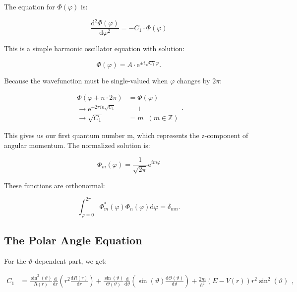 \documentclass[
  a4paper,
]{book}
\begin{document}
The equation for \(\Phi(\varphi)\) is:

\[
\frac{\mathrm{d}^2 \Phi \left(\varphi \right)}{\mathrm{d} \varphi^2} = - C_1 \cdot \Phi \left(\varphi \right)
\]

This is a simple harmonic oscillator equation with solution:

\[
\Phi \left(\varphi \right) = A \cdot \mathrm{e}^{\pm i \sqrt{C_1}\varphi} \mathrm{.}
\]

Because the wavefunction must be single-valued when \(\varphi\) changes
by \(2\pi\):

\[
\begin{aligned}
\Phi \left(\varphi + n \cdot 2 \pi \right) & =  \Phi \left(\varphi \right)\\
\longrightarrow \mathrm{e}^{\pm 2 \pi i n \sqrt{C_1}} & =  1\\
\longrightarrow \sqrt{C_1} & =  m \; \; \left( m \in \mathbb{Z} \right)
\end{aligned} \mathrm{.}
\]

This gives us our first quantum number m, which represents the
z-component of angular momentum. The normalized solution is:

\[
\Phi_m \left( \varphi \right) = \frac{1}{\sqrt{2\pi}} \mathrm{e}^{i m \varphi}
\]

These functions are orthonormal:

\[
\int_{\varphi = 0}^{2\pi} \Phi_m^{\ast} \left( \varphi \right) \Phi_n \left( \varphi \right) \mathrm{d} \varphi = \delta_{mn} \mathrm{.}
\]

\subsection{The Polar Angle Equation}\label{the-polar-angle-equation}

For the \(\vartheta\)-dependent part, we get:

\[
\begin{aligned}
C_1 & =
\frac{\sin^2\left( \vartheta \right)}{R \left( r \right)} \frac{\mathrm{d}}{\mathrm{d} r} \left( r^2 \frac{\mathrm{d} R \left( r \right)}{\mathrm{d} r} \right)
+ \frac{\sin \left( \vartheta \right)}{\Theta \left(\vartheta\right) } \frac{\mathrm{d}}{\mathrm{d} \vartheta} \left( \sin \left( \vartheta \right) \frac{\mathrm{d} \Theta \left(\vartheta\right)}{\mathrm{d} \vartheta} \right)
+ \frac{2m}{\hbar^2} \left( E - V\left( r \right) \right) r^2 \sin^2 \left( \vartheta \right)
\end{aligned} \mathrm{,}
\]
\end{document}
